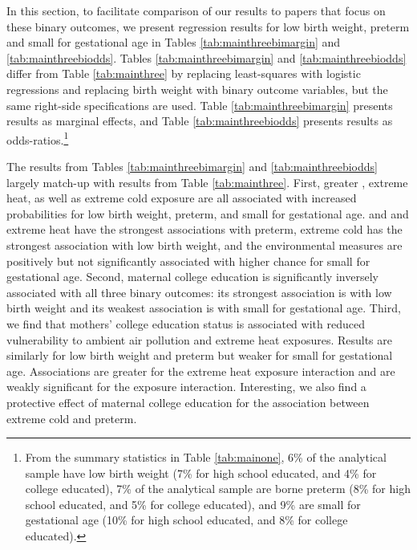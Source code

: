 In this section, to facilitate comparison of our results to papers that focus on these binary outcomes, we present regression results for low birth weight, preterm and small for gestational age in Tables \ref{tab:mainthreebimargin} and \ref{tab:mainthreebiodds}. Tables \ref{tab:mainthreebimargin} and \ref{tab:mainthreebiodds} differ from Table \ref{tab:mainthree} by replacing least-squares with logistic regressions and replacing birth weight with binary outcome variables, but the same right-side specifications are used. Table \ref{tab:mainthreebimargin} presents results as marginal effects, and Table \ref{tab:mainthreebiodds} presents results as odds-ratios.\footnote{From the summary statistics in Table \ref{tab:mainone}, 6\% of the analytical sample have low birth weight (7\% for high school educated, and 4\% for college educated), 7\% of the analytical sample are borne preterm (8\% for high school educated, and 5\% for college educated), and 9\% are small for gestational age (10\% for high school educated, and 8\% for college educated).} 

The results from Tables \ref{tab:mainthreebimargin} and \ref{tab:mainthreebiodds} largely match-up with results from Table \ref{tab:mainthree}. First, greater \PARPMTEN, extreme heat, as well as extreme cold exposure are all associated with increased probabilities for low birth weight, preterm, and small for gestational age. \PARPMTEN and and extreme heat have the strongest associations with preterm, extreme cold has the strongest association with low birth weight, and the environmental measures are positively but not significantly associated with higher chance for small for gestational age. Second, maternal college education is significantly inversely associated with all three binary outcomes: its strongest association is with low birth weight and its weakest association is with small for gestational age. Third, we find that mothers' college education status is associated with reduced vulnerability to ambient air pollution and extreme heat exposures. Results are similarly for low birth weight and preterm but weaker for small for gestational age. Associations are greater for the extreme heat exposure interaction and are weakly significant for the \PARPMTEN exposure interaction. Interesting, we also find a protective effect of maternal college education for the association between extreme cold and preterm. 




